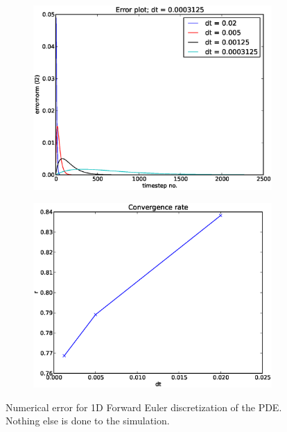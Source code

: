 \begin{figure}[H]
\centering
\begin{subfigure}[b]{0.48\textwidth}
\includegraphics[width=\textwidth]{../doc/results/experiment_18042014_1014_convergencetest_FE1D/results/errorplot.eps}
\caption{}%
\label{verification_FE1D:errorplot}
\end{subfigure}
\begin{subfigure}[b]{0.48\textwidth}
\includegraphics[width=\textwidth]{../doc/results/experiment_18042014_1014_convergencetest_FE1D/results/ConvergenceTest.eps}
 \caption{}
 \label{verification_FE1D:convergence}
\end{subfigure}
\caption[Error plot for 1D Forward Euler scheme]{Numerical error for 1D Forward Euler discretization of the PDE. Nothing else is done to the simulation.}
\label{verification_FE1D}
\end{figure}

